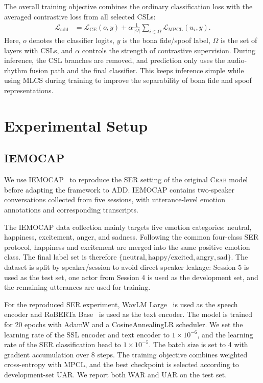 \documentclass[12pt, a4paper, twocolumn]{article}
\newcommand{\crab}{\textsc{Crab}}
\begin{document}
The overall training objective combines the ordinary classification loss with
the averaged contrastive loss from all selected CSLs:
\begin{equation}
\begin{aligned}
\mathcal{L}_{\mathrm{add}}
&=
\mathcal{L}_{\mathrm{CE}}(o,y)
+
\alpha \frac{1}{|\Omega|}
\sum_{i \in \Omega}
\mathcal{L}_{\mathrm{MPCL}}(u_i,y).
\end{aligned}
\end{equation}
Here, \(o\) denotes the classifier logits, \(y\) is the bona fide/spoof label,
\(\Omega\) is the set of layers with CSLs, and \(\alpha\) controls the strength
of contrastive supervision. During inference, the CSL branches are removed, and
prediction only uses the audio-rhythm fusion path and the final classifier.
This keeps inference simple while using MLCS during training to improve the
separability of bona fide and spoof representations.


\section{Experimental Setup}
\subsection{IEMOCAP}
We use IEMOCAP~\cite{busso2008iemocap} to reproduce the SER setting of the
original \crab{} model before adapting the framework to ADD\@. IEMOCAP contains
two-speaker conversations collected from five sessions, with utterance-level emotion
annotations and corresponding transcripts.

The IEMOCAP data collection mainly targets five emotion categories: neutral,
happiness, excitement, anger, and sadness. Following the common four-class SER
protocol, happiness and excitement are merged into the same positive emotion
class. The final label set is therefore
\(\{\mathrm{neutral}, \mathrm{happy/excited}, \mathrm{angry}, \mathrm{sad}\}\).
The dataset is split by speaker/session to avoid direct speaker leakage:
Session 5 is used as the test set, one actor from Session 4 is used as the
development set, and the remaining utterances are used for training.

For the reproduced SER experiment, WavLM Large~\cite{chen2022wavlm} is used as the speech encoder
and RoBERTa Base~\cite{liu2019roberta} is used as the text encoder. The model is trained for 20 epochs
with AdamW and a CosineAnnealingLR scheduler. We set the learning rate of the
SSL encoder and text encoder to \(1 \times 10^{-6}\), and the learning rate of
the SER classification head to \(1 \times 10^{-5}\). The batch size is set to 4
with gradient accumulation over 8 steps. The training objective combines
weighted cross-entropy with MPCL, and the best checkpoint is selected according
to development-set UAR\@. We report both WAR and UAR on the test set.
\end{document}
